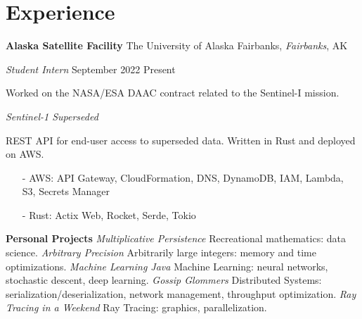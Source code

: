 ﻿\section{Experience}

\textbf{Alaska Satellite Facility}
\hfill
The University of Alaska Fairbanks, \textit{Fairbanks}, AK

\textit{Student Intern}
\hfill
{September 2022 \textendash\! Present}

\bigbreak

Worked on the NASA/ESA DAAC contract related to the Sentinel-I mission.

\bigbreak

\textit{Sentinel-1 Superseded}

REST API for end-user access to superseded data. Written in Rust and deployed on AWS.

\begin{itemize}\setlength\itemsep{-0.15cm}
    \item [-] AWS: API Gateway, CloudFormation, DNS, DynamoDB, IAM, Lambda, S3, Secrets Manager
    \item [-] Rust: Actix Web, Rocket, Serde, Tokio
\end{itemize}

\textbf{Personal Projects}
\bigbreak
\textit{Multiplicative Persistence} \textendash\! Recreational mathematics: data science.
\bigbreak
\textit{Arbitrary Precision} \textendash\! Arbitrarily large integers: memory and time optimizations.
\bigbreak
\textit{Machine Learning Java} \textendash\! Machine Learning: neural networks, stochastic descent, deep learning.
\bigbreak
\textit{Gossip Glommers} \textendash\! Distributed Systems: serialization/deserialization, network management, throughput optimization.
\bigbreak
\textit{Ray Tracing in a Weekend} \textendash\! Ray Tracing: graphics, parallelization.